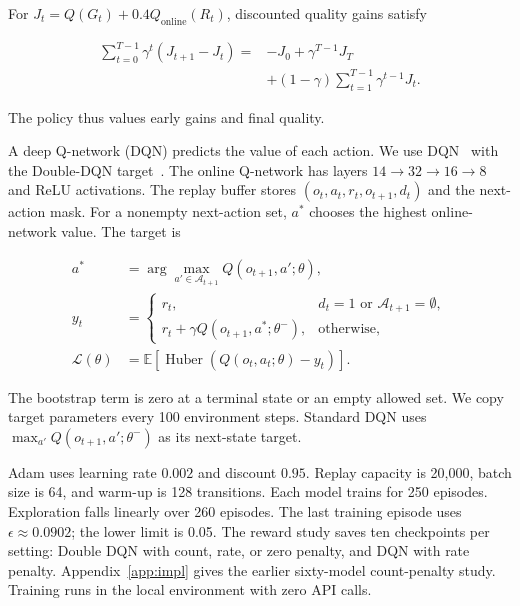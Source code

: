 For $J_t=Q(G_t)+0.4Q_{\mathrm{online}}(R_t)$, discounted quality gains satisfy

\begin{equation}
\begin{split}
\sum_{t=0}^{T-1}\gamma^t(J_{t+1}-J_t)
={}&-J_0+\gamma^{T-1}J_T\\
&+(1-\gamma)\sum_{t=1}^{T-1}\gamma^{t-1}J_t.
\end{split}
\end{equation}

The policy thus values early gains and final quality.

A deep Q-network (DQN) predicts the value of each action.
We use DQN~\cite{mnih2015human} with the Double-DQN target~\cite{vanhasselt2016deep}.
The online Q-network has layers $14\rightarrow32\rightarrow16\rightarrow8$
and ReLU activations. The replay buffer stores $(o_t,a_t,r_t,o_{t+1},d_t)$
and the next-action mask. For a nonempty next-action set, $a^*$ chooses
the highest online-network value. The target is

\begin{equation}
\begin{aligned}
a^*&=\arg\max_{a'\in\mathcal A_{t+1}}Q(o_{t+1},a';\theta),\\
y_t&=\begin{cases}
r_t,&d_t=1\text{ or }\mathcal A_{t+1}=\emptyset,\\
r_t+\gamma Q(o_{t+1},a^*;\theta^-),&\text{otherwise},
\end{cases}\\
\mathcal L(\theta)&=\mathbb E[\operatorname{Huber}(Q(o_t,a_t;\theta)-y_t)].
\end{aligned}
\end{equation}

The bootstrap term is zero at a terminal state or an empty allowed set.
We copy target parameters every 100 environment steps. Standard DQN uses
$\max_{a'}Q(o_{t+1},a';\theta^-)$ as its next-state target.

Adam uses learning rate $0.002$ and discount $0.95$. Replay capacity is
20,000, batch size is 64, and warm-up is 128 transitions. Each model trains
for 250 episodes. Exploration falls linearly over 260 episodes.
The last training episode uses $\epsilon\approx0.0902$; the lower limit
is 0.05. The reward study saves ten checkpoints per setting: Double DQN
with count, rate, or zero penalty, and DQN with rate penalty.
Appendix~\ref{app:impl} gives the earlier sixty-model count-penalty study.
Training runs in the local environment with zero API calls.

